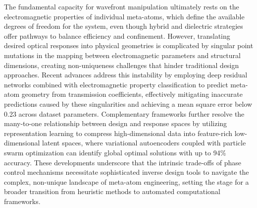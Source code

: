 The fundamental capacity for wavefront manipulation ultimately rests on the electromagnetic properties of individual meta-atoms, which define the available degrees of freedom for the system, even though hybrid and dielectric strategies offer pathways to balance efficiency and confinement. However, translating desired optical responses into physical geometries is complicated by singular point mutations in the mapping between electromagnetic parameters and structural dimensions, creating non-uniqueness challenges that hinder traditional design approaches. Recent advances address this instability by employing deep residual networks combined with electromagnetic property classification to predict meta-atom geometry from transmission coefficients, effectively mitigating inaccurate predictions caused by these singularities and achieving a mean square error below 0.23 across dataset parameters. \citep{doi_10_1109_iccem60619_2024_10559188_c3199408} \citep{doi_10_1109_isctis58954_2023_10213114_7fee3b45} Complementary frameworks further resolve the many-to-one relationship between design and response spaces by utilizing representation learning to compress high-dimensional data into feature-rich low-dimensional latent spaces, where variational autoencoders coupled with particle swarm optimization can identify global optimal solutions with up to 94\% accuracy. These developments underscore that the intrinsic trade-offs of phase control mechanisms necessitate sophisticated inverse design tools to navigate the complex, non-unique landscape of meta-atom engineering, setting the stage for a broader transition from heuristic methods to automated computational frameworks. \citep{doi_10_1109_iccem60619_2024_10559188_c3199408} \citep{doi_10_2139_ssrn_4082312_28ca582d}

